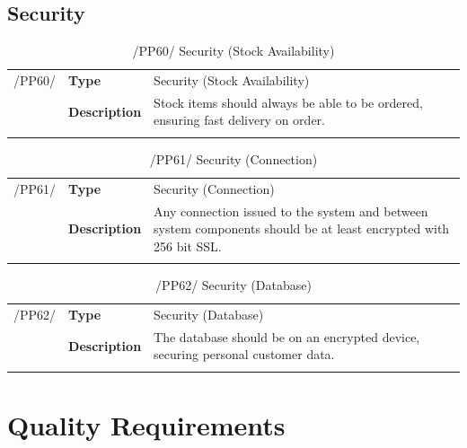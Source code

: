 \documentclass[11pt,a4paper,oneside,svgnames]{report}
\begin{document}
\section{Security}
\begin{table}[H]
\centering
\begin{tabular}{llp{8.75cm}}
\cellcolor{white}/PP60/	& \textbf{Type}			& Security (Stock Availability)\\
\cellcolor{white}		& \textbf{Description}	& Stock items should always be able to be ordered, ensuring fast delivery on order.\\
\cellcolor{white}		\hfill \\
\end{tabular}
\caption{/PP60/ Security (Stock Availability)}
\label{tab:pp60}
\end{table}

\begin{table}[H]
\centering
\begin{tabular}{llp{8.75cm}}
\cellcolor{white}/PP61/	& \textbf{Type}			& Security (Connection)\\
\cellcolor{white}		& \textbf{Description}	& Any connection issued to the system and between system components should be at least encrypted with 256 bit SSL.\\
\cellcolor{white}		\hfill \\
\end{tabular}
\caption{/PP61/ Security (Connection)}
\label{tab:pp61}
\end{table}

\begin{table}[H]
\centering
\begin{tabular}{llp{8.75cm}}
\cellcolor{white}/PP62/	& \textbf{Type}			& Security (Database)\\
\cellcolor{white}		& \textbf{Description}	& The database should be on an encrypted device, securing personal customer data.\\
\cellcolor{white}		\hfill \\
\end{tabular}
\caption{/PP62/ Security (Database)}
\label{tab:pp62}
\end{table}


\chapter{Quality Requirements}
\end{document}
